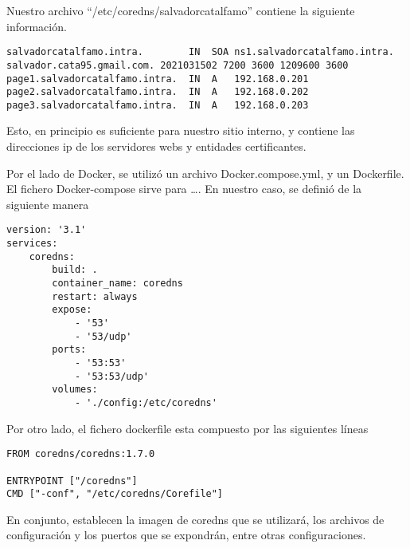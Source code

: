 Nuestro archivo “/etc/coredns/salvadorcatalfamo” contiene la siguiente información.
\begin{verbatim}
salvadorcatalfamo.intra.        IN  SOA ns1.salvadorcatalfamo.intra. salvador.cata95.gmail.com. 2021031502 7200 3600 1209600 3600
page1.salvadorcatalfamo.intra.  IN  A   192.168.0.201
page2.salvadorcatalfamo.intra.  IN  A   192.168.0.202
page3.salvadorcatalfamo.intra.  IN  A   192.168.0.203    
\end{verbatim}

Esto, en principio es suficiente para nuestro sitio interno, y contiene las direcciones ip de los 
servidores webs y entidades certificantes.

Por el lado de Docker, se utilizó un archivo Docker.compose.yml, y un Dockerfile. El fichero 
Docker-compose sirve para …. En nuestro caso, se definió de la siguiente manera

\begin{verbatim}
version: '3.1'
services:
    coredns:
        build: .
        container_name: coredns
        restart: always
        expose:
            - '53'
            - '53/udp'
        ports:
            - '53:53'
            - '53:53/udp'
        volumes:
            - './config:/etc/coredns'    
\end{verbatim}

Por otro lado, el fichero dockerfile esta compuesto por las siguientes líneas
\begin{verbatim}
FROM coredns/coredns:1.7.0

ENTRYPOINT ["/coredns"]
CMD ["-conf", "/etc/coredns/Corefile"]    
\end{verbatim}

En conjunto, establecen la imagen de coredns que se utilizará, los archivos de configuración y
los puertos que se expondrán, entre otras configuraciones.
